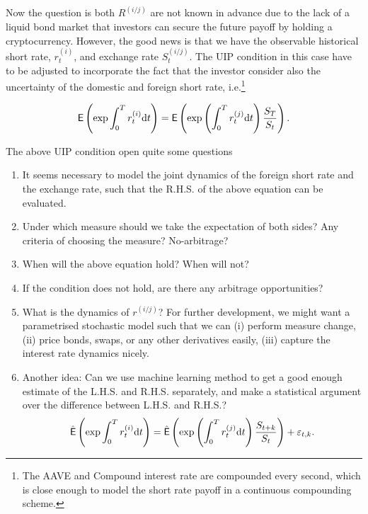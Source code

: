 \documentclass[square]{article} %
\theoremstyle{plain}
\theoremstyle{definition} %
\begin{document}
Now the question is both $R^{(i/j)}$ are not known in advance due to the lack of a liquid bond market that investors can secure the future payoff by holding a cryptocurrency. 
However, the good news is that we have the observable historical short rate, $r_t^{(i)}$, and exchange rate $S_t^{(i/j)}$. 
The UIP condition in this case have to be adjusted to incorporate the fact that the investor consider also the uncertainty of the domestic and foreign short rate, i.e.\footnote{The AAVE and Compound interest rate are compounded every second, which is close enough to model the short rate payoff in a continuous compounding scheme. }

\begin{align*}
  \mathbb{\sf E} \left(\exp{\int_0^T r^{(i)}_t \text{d}t}\right) = \mathbb{\sf E}\left(\exp\left(\int_0^T r^{(j)}_t\text{d}t\right)\frac{S_{T}}{S_t}\right).
  \end{align*}

The above UIP condition open quite some questions
\begin{enumerate}
  \item It seems necessary to model the joint dynamics of the foreign short rate and the exchange rate, such that the R.H.S. of the above equation can be evaluated.
  \item Under which measure should we take the expectation of both sides? Any criteria of choosing the measure? No-arbitrage? 
  \item When will the above equation hold? When will not?
  \item If the condition does not hold, are there any arbitrage opportunities? 
  \item What is the dynamics of $r^{(i/j)}$? For further development, we might want a parametrised stochastic model such that we can
   (i) perform measure change, (ii) price bonds, swaps, or any other derivatives easily, (iii) capture the interest rate dynamics nicely.
  \item Another idea: Can we use machine learning method to get a good enough estimate of the L.H.S. and R.H.S. separately, and make a statistical argument over the difference between L.H.S. and R.H.S.?
  \begin{align*}
    \hat{\mathbb{\sf E}} \left(\exp{\int_0^T r^{(i)}_t \text{d}t}\right) = \hat{\mathbb{\sf E}}\left(\exp\left(\int_0^T r^{(j)}_t\text{d}t\right)\frac{S_{t+k}}{S_t}\right) + \varepsilon_{t, k}.
  \end{align*}

\end{enumerate}
\end{document}
